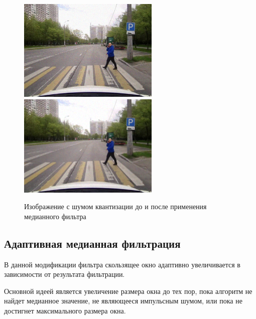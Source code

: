 \begin{figure}[ht]
    \centering
    \includegraphics[width=0.6\textwidth]{../outputs/image_quant_noise.png}
    \includegraphics[width=0.6\textwidth]{../addition/image_quant_median_filter_k5.png}
    \caption{Изображение с шумом квантизации до и после применения медианного фильтра}
    \label{fig:stich_images}
\end{figure}

\pagebreak

\subsection{Адаптивная медианная фильтрация}

В данной модификации фильтра скользящее окно
адаптивно увеличивается в зависимости от результата фильтрации.

Основной идеей является увеличение размера окна до тех пор,
пока алгоритм не найдет медианное значение, не являющееся импульсным шумом, или пока 
не достигнет максимального размера окна.


